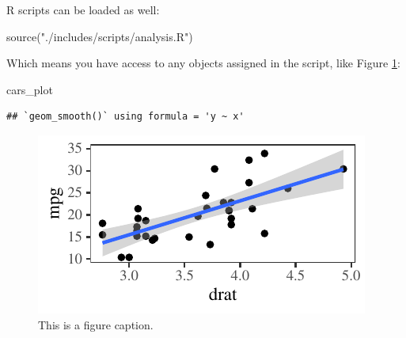 \documentclass[
  a4paper,
  11pt,
  twocolumn]{article}
\newenvironment{Shaded}{\begin{snugshade}}{\end{snugshade}}
\newcommand{\FunctionTok}[1]{\textcolor[rgb]{0.94,0.94,0.56}{#1}}
\newcommand{\NormalTok}[1]{\textcolor[rgb]{0.80,0.80,0.80}{#1}}
\newcommand{\StringTok}[1]{\textcolor[rgb]{0.80,0.58,0.58}{#1}}
\begin{document}
R scripts can be loaded as well:

\begin{Shaded}
\begin{Highlighting}[]
\FunctionTok{source}\NormalTok{(}\StringTok{"./includes/scripts/analysis.R"}\NormalTok{)}
\end{Highlighting}
\end{Shaded}

Which means you have access to any objects assigned in the script, like
Figure \ref{fig:ex_plot}:

\begin{Shaded}
\begin{Highlighting}[]
\NormalTok{cars\_plot}
\end{Highlighting}
\end{Shaded}

\begin{verbatim}
## `geom_smooth()` using formula = 'y ~ x'
\end{verbatim}

\begin{figure}[!h]
\caption{This is a figure caption.}\label{fig:ex_plot}


\begin{center}\includegraphics{master_files/figure-latex/ex_plot-1} \end{center}

\end{figure}




\theendnotes
\end{document}

